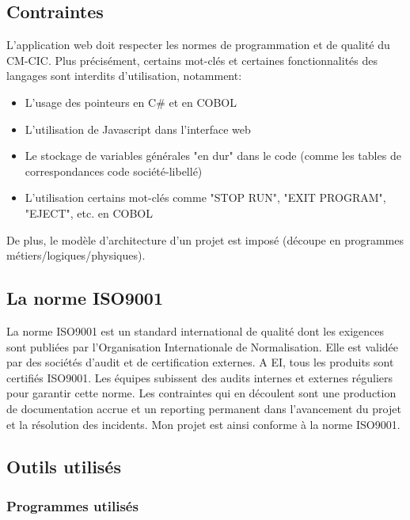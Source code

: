 \documentclass[a4paper,french,8pt]{article}
\begin{document}
	\subsection{Contraintes}
		
		L'application web doit respecter les normes de programmation et de qualité du CM-CIC. Plus précisément, certains mot-clés et certaines fonctionnalités des langages sont interdits d'utilisation,
		notamment:
		
		\begin{itemize}
			\item L'usage des pointeurs en C\# et en COBOL
			\item L'utilisation de Javascript dans l'interface web
			\item Le stockage de variables générales "en dur" dans le code (comme les tables de correspondances code société-libellé)
			\item L'utilisation certains mot-clés comme "STOP RUN", "EXIT PROGRAM", "EJECT", etc. en COBOL
		\end{itemize}
		
		De plus, le modèle d'architecture d'un projet est imposé (découpe en programmes métiers/logiques/physiques).
	
	\subsection{La norme ISO9001}
	
		La norme ISO9001 est un standard international  de qualité dont les exigences sont publiées par l’Organisation Internationale de Normalisation.
		Elle est validée par des sociétés d’audit et de certification externes. 
		A EI, tous les produits sont certifiés ISO9001. Les équipes subissent des audits internes et externes réguliers pour garantir cette norme. 
		Les contraintes qui en découlent sont une production de documentation accrue et un reporting permanent dans l’avancement du projet et la résolution des incidents.
		Mon projet est ainsi conforme à la norme ISO9001.

	\subsection{Outils utilisés}
	
		\subsubsection{Programmes utilisés}
		
\end{document}
